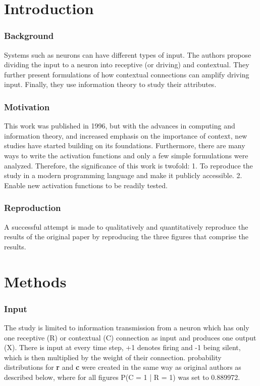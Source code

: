 \section{Introduction}


\subsubsection{Background}
Systems such as neurons can have different types of input. The authors\supercite{Smyth:1996} propose dividing the input to a neuron into receptive (or driving) and contextual. They further present formulations of how contextual connections can amplify driving input. Finally, they use information theory to study their attributes.

\subsubsection{Motivation}
This work was published in 1996, but with the advances in computing and information theory, and increased emphasis on the importance of context\supercite{Larkum:2013}, new studies\supercite{Kay:2011,Wibral:2017} have started building on its foundations. Furthermore, there are many ways to write the activation functions and only a few simple formulations were analyzed. Therefore, the significance of this work is twofold: 1. To reproduce the study in a modern programming language and make it publicly accessible.   2. Enable new activation functions to be readily tested.

\subsubsection{Reproduction}
A successful attempt is made to qualitatively and quantitatively reproduce the results of the original paper by reproducing the three figures that comprise the results.

\section{Methods}


\subsubsection{Input}
The study is limited to information transmission from a neuron which has only one receptive (R) or contextual (C) connection as input and produces one output (X). There is input at every time step, +1 denotes firing and -1 being silent, which is then multiplied by the weight of their connection. probability distributions for \textbf{r} and \textbf{c} were created in the same way as original authors as described below, where for all figures P(C = 1 | R = 1) was set to 0.889972. 

